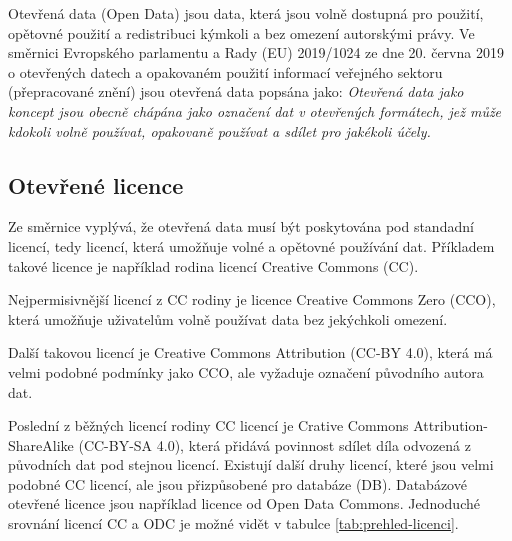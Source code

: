 Otevřená data (Open Data) jsou data, která jsou volně dostupná pro použití, opětovné použití a redistribuci kýmkoli a bez omezení autorskými právy. \parencite{CoJsouOtevrena2022} Ve směrnici Evropského parlamentu a Rady (EU) 2019/1024 ze dne 20. června 2019 o otevřených datech a opakovaném použití informací veřejného sektoru (přepracované znění) jsou otevřená data popsána jako: \textit{Otevřená data jako koncept jsou obecně chápána jako označení dat v otevřených formátech, jež může kdokoli volně používat, opakovaně používat a sdílet pro jakékoli účely.} \parencite[důvod č.~16]{SmerniceEvropskehoParlamentu2019}
 
\subsection{Otevřené licence}
Ze směrnice vyplývá, že otevřená data musí být poskytována pod standadní licencí, tedy licencí, která umožňuje volné a opětovné používání dat. \parencite[důvod č.~44]{SmerniceEvropskehoParlamentu2019} Příkladem takové licence je například rodina licencí Creative Commons (CC).

Nejpermisivnější licencí z CC rodiny je licence Creative Commons Zero (CCO), která umožňuje uživatelům volně používat data bez jekýchkoli omezení. \parencite{DeedCC010}

Další takovou licencí je Creative Commons Attribution (CC-BY 4.0), která má velmi podobné podmínky jako CCO, ale vyžaduje označení původního autora dat. \parencite{DeedAttribution40}

Poslední z běžných licencí rodiny CC licencí je Crative Commons Attribution-ShareAlike (CC-BY-SA 4.0), která přidává povinnost sdílet díla odvozená z původních dat pod stejnou licencí. \parencite{DeedAttributionShareAlike40} Existují další druhy licencí, které jsou velmi podobné CC licencí, ale jsou přizpůsobené pro databáze (DB). Databázové otevřené licence jsou například licence od Open Data Commons. Jednoduché srovnání licencí CC a ODC je možné vidět v tabulce \ref{tab:prehled-licenci}. \parencite{ReusersGuideOpen2013,CCLicenses}

